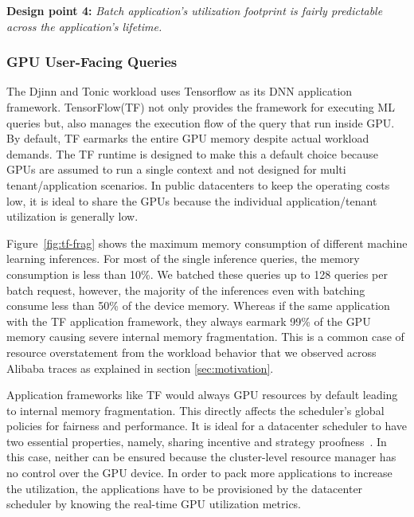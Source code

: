 \textbf{Design point 4:} \textit{Batch application's utilization footprint is fairly predictable across the application's lifetime.}
\subsubsection{GPU User-Facing Queries}
\label{sec:TF-mem-sec}
The Djinn and Tonic workload uses Tensorflow as its DNN application framework. TensorFlow(TF) not only provides the framework for executing ML queries but, also manages the execution flow of the query that run inside GPU. By default, TF earmarks the entire GPU memory despite actual workload demands. The TF runtime is designed to make this a default choice because GPUs are assumed to run a single context and not designed for multi tenant/application scenarios. In public datacenters to keep the operating costs low, it is ideal to share the GPUs because the individual application/tenant utilization is generally low. 

Figure~\ref{fig:tf-frag} shows the maximum memory consumption of different machine learning inferences. For most of the single inference queries, the memory consumption is less than 10\%. We batched these queries up to 128 queries per batch request, however, the majority of the inferences even with batching consume less than 50\% of the device memory. Whereas if the same application with the TF  application framework, they always earmark 99\% of the GPU memory causing severe internal memory fragmentation. This is a common case of resource overstatement from the workload behavior that we observed across Alibaba traces as explained in section \ref{sec:motivation}. 

Application frameworks like TF would always GPU resources by default leading to internal memory fragmentation. This directly affects the scheduler's global policies for fairness and performance. It is ideal for a datacenter scheduler to have two essential properties, namely, sharing incentive and strategy proofness~\cite{Ghodsi:2011:DRF:1972457.1972490}. In this case, neither can be ensured because the cluster-level resource manager has no control over the GPU device. In order to pack more applications to increase the utilization, the applications have to be provisioned by the datacenter scheduler by knowing the real-time GPU utilization metrics. 

